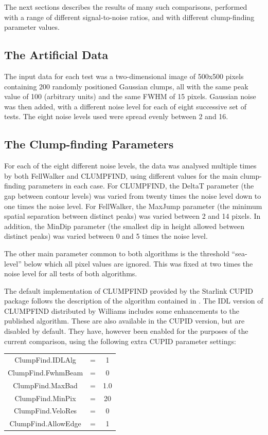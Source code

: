 \documentclass[final,authoryear,5p,times,twocolumn]{elsarticle}
\begin{document}
The next sections describes the results of many such comparisons,
performed with a range of different signal-to-noise ratios, and with
different clump-finding parameter values.

\subsection{The Artificial Data}
The input data for each test was a two-dimensional image of 500x500
pixels containing 200 randomly positioned Gaussian clumps, all with the
same peak value of 100 (arbitrary units) and the same FWHM of 15 pixels.
Gaussian noise was then added, with a different noise level for each of
eight successive set of tests. The eight noise levels used were
spread evenly between 2 and 16.

\subsection{The Clump-finding Parameters}
For each of the eight different noise levels, the data was analysed
multiple times by both FellWalker and CLUMPFIND, using different values
for the main clump-finding parameters in each case. For CLUMPFIND, the
DeltaT parameter (the gap between contour levels) was varied from twenty
times the noise level down to one times the noise level. For FellWalker,
the MaxJump parameter (the minimum spatial separation between distinct
peaks) was varied between 2 and 14 pixels. In addition, the MinDip
parameter (the smallest dip in height allowed between distinct peaks) was
varied between 0 and 5 times the noise level.

The other main parameter common to both algorithms is the threshold
``sea-level'' below which all pixel values are ignored. This was fixed at
two times the noise level for all tests of both algorithms.

The default implementation of CLUMPFIND provided by the Starlink CUPID
package follows the description of the algorithm contained in
\cite{1994Williams}. The IDL version of CLUMPFIND distributed by Williams
includes some enhancements to the published algorithm. These are also
available in the CUPID version, but are disabled by default. They have,
however been enabled for the purposes of the current comparison, using
the following extra CUPID parameter settings:

\smallskip
\begin{tabular}{c c c}
ClumpFind.IDLAlg & = & 1 \\
ClumpFind.FwhmBeam & = & 0 \\
ClumpFind.MaxBad & = & 1.0 \\
ClumpFind.MinPix & = & 20 \\
ClumpFind.VeloRes & = & 0 \\
ClumpFind.AllowEdge & = & 1 \\
\end{tabular}
\smallskip
\end{document}
